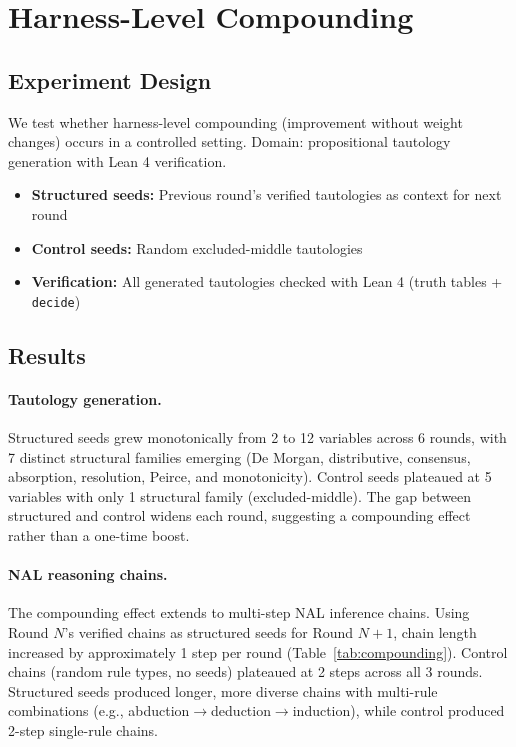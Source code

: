 \documentclass{article}
\begin{document}
\section{Harness-Level Compounding}
\label{sec:compounding}

\subsection{Experiment Design}

We test whether harness-level compounding (improvement without weight changes) occurs in a controlled setting. Domain: propositional tautology generation with Lean 4 verification.

\begin{itemize}
    \item \textbf{Structured seeds:} Previous round's verified tautologies as context for next round
    \item \textbf{Control seeds:} Random excluded-middle tautologies
    \item \textbf{Verification:} All generated tautologies checked with Lean 4 (truth tables + \texttt{decide})
\end{itemize}

\subsection{Results}

\paragraph{Tautology generation.} Structured seeds grew monotonically from 2 to 12 variables across 6 rounds, with 7 distinct structural families emerging (De Morgan, distributive, consensus, absorption, resolution, Peirce, and monotonicity). Control seeds plateaued at 5 variables with only 1 structural family (excluded-middle). The gap between structured and control widens each round, suggesting a compounding effect rather than a one-time boost.

\paragraph{NAL reasoning chains.} The compounding effect extends to multi-step NAL inference chains. Using Round $N$'s verified chains as structured seeds for Round $N+1$, chain length increased by approximately 1 step per round (Table~\ref{tab:compounding}). Control chains (random rule types, no seeds) plateaued at 2 steps across all 3 rounds. Structured seeds produced longer, more diverse chains with multi-rule combinations (e.g., abduction$\to$deduction$\to$induction), while control produced 2-step single-rule chains.
\end{document}
